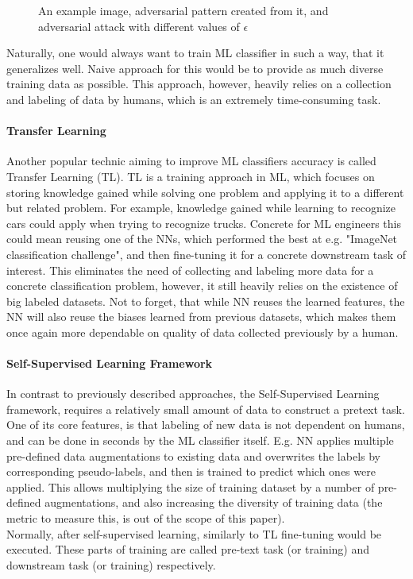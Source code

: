 \begin{figure}[h]
    \caption{An example image, adversarial pattern created from it, and adversarial attack with different values of $\epsilon$}
    \label{fig:fig-adv}
\end{figure}


Naturally,
one would always want to train ML classifier in such a way, that it generalizes well.
Naive approach for this would be to provide as much diverse training data as possible.
This approach, however, heavily relies on a collection and labeling of data by humans, which is an extremely
time-consuming task.

\paragraph{Transfer Learning}
Another popular technic aiming to improve ML classifiers accuracy is called Transfer Learning (TL).
TL is a training approach in ML, which focuses on storing knowledge gained while solving one
problem and applying it to a different but related problem.
For example, knowledge gained while learning to recognize cars could apply when trying to recognize trucks.
Concrete for ML engineers this could mean reusing one of the NNs, which performed the best at e.g.
"ImageNet classification challenge", and then fine-tuning it for a concrete downstream task of interest.
This eliminates the need of collecting and labeling more data for a concrete classification problem,
however, it still heavily relies on the existence of big labeled datasets.
Not to forget, that while NN reuses the learned features, the NN will also reuse
the biases learned from previous datasets, which makes them once again more dependable on quality of data
collected previously by a human.


\paragraph{Self-Supervised Learning Framework}
In contrast to previously described approaches, the Self-Supervised Learning framework,
requires a relatively small amount of data to construct a pretext task.
One of its core features, is that
labeling of new data is not dependent on humans, and can be done in seconds by the ML classifier itself.
E.g. NN applies multiple pre-defined data augmentations to existing data and overwrites the labels by corresponding
pseudo-labels, and then is trained to predict which ones were applied.
This allows multiplying the size of
training dataset by a number of pre-defined augmentations, and also increasing the diversity of training data
(the metric to measure this, is out of the scope of this paper).
\\
Normally, after self-supervised learning, similarly to TL fine-tuning would be executed.
These parts of training are called pre-text task (or training) and downstream task (or training) respectively.

